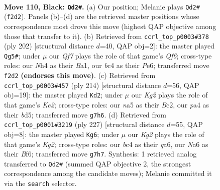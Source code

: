 \documentclass[11pt]{article}
\begin{document}
\clearpage

\begin{figure}[p]\centering
\begin{subfigure}{0.46\textwidth}\centering
\resizebox{\linewidth}{!}{%
\newchessgame
\chessboard[
  setfen={8/6k1/n7/N7/PpB1P2n/4b3/5q1p/3K4 b - - 13 110},
  showmover=false,
  pgfstyle=straightmove, color=movearrow, markmove={f2-d2}
]}
\caption{}
\end{subfigure}\hfill
\begin{subfigure}{0.46\textwidth}\centering
\resizebox{\linewidth}{!}{%
\newchessgame
\chessboard[
  setfen={4b3/8/4PQ2/2PP3k/5K2/8/p7/B7 w - - 7 102},
  showmover=false,
  pgfstyle=straightmove, color=movearrow, markmove={f6-g5}
]}
\caption{}
\end{subfigure}
\\[4pt]
\begin{subfigure}{0.46\textwidth}\centering
\resizebox{\linewidth}{!}{%
\newchessgame
\chessboard[
  setfen={8/3k4/1b3p2/3bnN2/P7/2B5/2B1K3/8 w - - 9 108},
  showmover=false,
  pgfstyle=straightmove, color=movearrow, markmove={e2-d2}
]}
\caption{}
\end{subfigure}\hfill
\begin{subfigure}{0.46\textwidth}\centering
\resizebox{\linewidth}{!}{%
\newchessgame
\chessboard[
  setfen={8/6k1/Q4b2/8/5q2/2P3p1/1P4B1/1K6 b - - 17 114},
  showmover=false,
  pgfstyle=straightmove, color=movearrow, markmove={g7-g6}
]}
\caption{}
\end{subfigure}
\caption{\textbf{Move 110, Black: \texttt{Qd2\#}.} (a) Our position; Melanie plays \texttt{Qd2\#} (\texttt{f2d2}). Panels (b)--(d) are the retrieved master positions whose correspondence most drove this move (highest QAP objective among those that transfer to it). (b) Retrieved from \texttt{ccrl\_top\_p0003\#378} (ply 202) [structural distance $d$=40, QAP obj=2]: the master played \texttt{Qg5\#}; under $\mu$ our \emph{Qf7} plays the role of that game's \emph{Qf6}; cross-type roles: our \emph{N}h4 as their \emph{B}a1, our \emph{b}c4 as their \emph{P}e6; transferred move \texttt{f2d2} \textbf{(endorses this move)}. (c) Retrieved from \texttt{ccrl\_top\_p0003\#457} (ply 214) [structural distance $d$=56, QAP obj=19]: the master played \texttt{Kd2}; under $\mu$ our \emph{Kg2} plays the role of that game's \emph{Ke2}; cross-type roles: our \emph{n}a5 as their \emph{B}c2, our \emph{p}a4 as their \emph{b}d5; transferred move \texttt{g7h6}. (d) Retrieved from \texttt{ccrl\_top\_p0001\#3219} (ply 227) [structural distance $d$=55, QAP obj=8]: the master played \texttt{Kg6}; under $\mu$ our \emph{Kg2} plays the role of that game's \emph{Kg2}; cross-type roles: our \emph{b}c4 as their \emph{q}a6, our \emph{N}a6 as their \emph{B}f6; transferred move \texttt{g7h7}. Synthesis: 1 retrieved analog transferred to \texttt{Qd2\#} (summed QAP objective 2, the strongest correspondence among the candidate moves); Melanie committed it via the \texttt{search} selector.}
\label{fig:thought-m219}
\end{figure}
\end{document}
